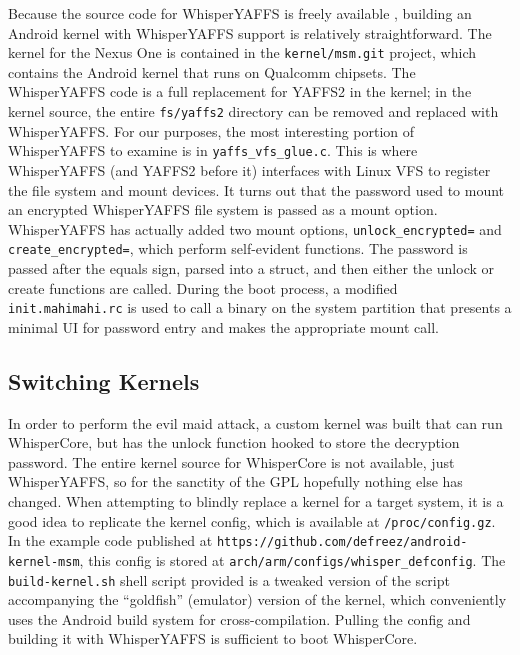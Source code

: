Because the source code for WhisperYAFFS is freely available \cite{whisperyaffs}, building an Android kernel with WhisperYAFFS
support is relatively straightforward. The kernel for the Nexus One is contained in the \texttt{kernel/msm.git} project, which contains the
Android kernel that runs on Qualcomm chipsets.  The WhisperYAFFS code is a full replacement for YAFFS2 in the kernel; in the kernel
source, the entire \texttt{fs/yaffs2} directory can be removed and replaced with WhisperYAFFS.  For our purposes, the most
interesting portion of WhisperYAFFS to examine is in \texttt{yaffs\_vfs\_glue.c}.  This is where WhisperYAFFS (and YAFFS2 before it)
interfaces with Linux VFS to register the file system and mount devices.  It turns out that the password used to mount an encrypted
WhisperYAFFS file system is passed as a mount option.  WhisperYAFFS has actually added two mount options, \texttt{unlock\_encrypted=}
and \texttt{create\_encrypted=}, which perform self-evident functions.  The password is passed after the equals sign, parsed into a
struct, and then either the unlock or create functions are called.  During the boot process, a modified \texttt{init.mahimahi.rc} is
used to call a binary on the system partition that presents a minimal UI for password entry and makes the appropriate mount call. 

\subsection{Switching Kernels}
In order to perform the evil maid attack, a custom kernel was built that can run WhisperCore, but has the unlock function hooked
to store the decryption password.  The entire kernel source for WhisperCore is not available, just WhisperYAFFS, so for the sanctity
of the GPL hopefully nothing else has changed.  When attempting to blindly replace a kernel for a target system, it is a good idea
to replicate the kernel config, which is available at \texttt{/proc/config.gz}.  In the example code published at
\texttt{https://github.com/defreez/android-kernel-msm}, this config is stored at \texttt{arch/arm/configs/whisper\_defconfig}.  The
\texttt{build-kernel.sh} shell script provided is a tweaked version of the script accompanying the ``goldfish'' (emulator) version
of the kernel, which conveniently uses the Android build system for cross-compilation.  Pulling the config and building it with
WhisperYAFFS is sufficient to boot WhisperCore.

